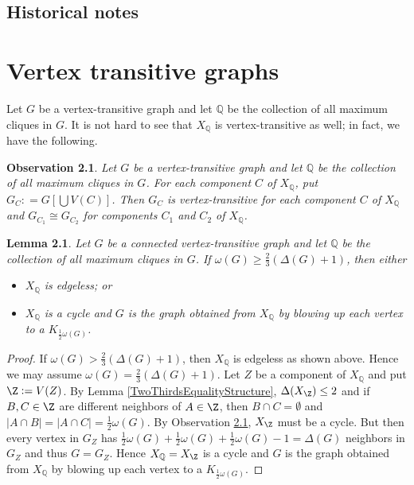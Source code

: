 \documentclass[openany]{tufte-book} %
\theoremstyle{plain}
\newtheorem{lemma}{Lemma}
\newtheorem{observation}{Observation}
\newcommand{\card}[1]{\left|#1\right|}
\newcommand{\parens}[1]{\left( #1 \right)}
\newcommand{\brackets}[1]{\left[ #1 \right]}
\newcommand{\DefinedAs}{\mathrel{\mathop:}=}
\newcommand{\Q}{\mathbb{Q}}
\begin{document}
\section{Historical notes}

\chapter{Vertex transitive graphs}
Let $G$ be a vertex-transitive graph and let $\Q$ be the collection of all
maximum cliques in $G$.  It is not hard to see that $X_\Q$ is vertex-transitive
as well; in fact, we have the following.

\begin{observation}\label{transitiveClustering}
Let $G$ be a vertex-transitive graph and let $\Q$ be the collection of all
maximum cliques in $G$.  For each component $C$ of $X_\Q$, put $G_C \DefinedAs
G\brackets{\bigcup V(C)}$.  Then $G_C$ is vertex-transitive for each component
$C$ of $X_\Q$ and $G_{C_1} \cong G_{C_2}$ for components $C_1$ and $C_2$ of
$X_\Q$.
\end{observation}

\begin{lemma}\label{TransitiveClusteringBigCliques}
Let $G$ be a connected vertex-transitive graph and let $\Q$ be the collection
of all maximum cliques in $G$.  If $\omega(G) \ge \frac23 \parens{\Delta(G) +
1}$, then either
\begin{itemize}
\item $X_\Q$ is edgeless; or
\item $X_\Q$ is a cycle and $G$ is the graph obtained from $X_\Q$ by blowing up each vertex to a $K_{\frac12 \omega(G)}$.
\end{itemize}
\end{lemma}
\begin{proof}
If $\omega(G) > \frac23 \parens{\Delta(G) + 1}$, then $X_\Q$ is edgeless as shown above.  Hence we may assume $\omega(G) = \frac23 \parens{\Delta(G) + 1}$.  
Let $Z$ be a component of $X_\Q$ and put $\Z \DefinedAs V(Z)$.
By Lemma \ref{TwoThirdsEqualityStructure}, $\Delta(X_\Z) \le 2$ and if $B, C \in \Z$ are 
different neighbors of $A \in \Z$, then $B \cap C = \emptyset$ and $\card{A \cap B} = \card{A \cap C} = \frac12 \omega(G)$.  
By Observation \ref{transitiveClustering}, $X_\Z$ must be a cycle.  But then every vertex in $G_Z$ has 
$\frac12 \omega(G) + \frac12 \omega(G) + \frac12 \omega(G) - 1 = \Delta(G)$ neighbors in $G_Z$ and thus $G = G_Z$.  
Hence $X_\Q = X_\Z$ is a cycle and $G$ is the graph obtained from $X_\Q$ by blowing up each vertex to a $K_{\frac12 \omega(G)}$.
\end{proof}
\end{document}
